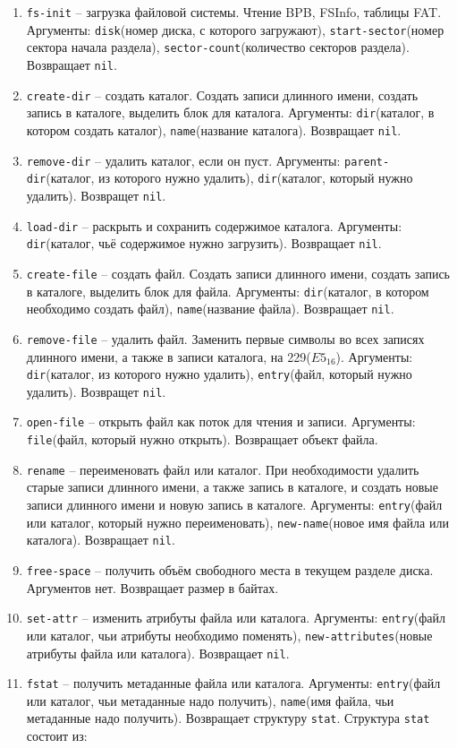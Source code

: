 \begin{enumerate}
	\begin{enumerate}
	\item \texttt{fs-init} -- загрузка файловой системы. Чтение BPB, FSInfo, таблицы FAT. Аргументы: \texttt{disk}(номер диска, с которого загружают), \texttt{start-sector}(номер сектора начала раздела), \texttt{sector-count}(количество секторов раздела). Возвращает \texttt{nil}.
	\item \texttt{create-dir} -- создать каталог. Создать записи длинного имени, создать запись в каталоге, выделить блок для каталога. Аргументы: \texttt{dir}(каталог, в котором создать каталог), \texttt{name}(название каталога). Возвращает \texttt{nil}.
	\item \texttt{remove-dir} -- удалить каталог, если он пуст. Аргументы: \texttt{parent-dir}(каталог, из которого нужно удалить), \texttt{dir}(каталог, который нужно удалить). Возвращет \texttt{nil}.
	\item \texttt{load-dir} -- раскрыть и сохранить содержимое каталога. Аргументы: \texttt{dir}(каталог, чьё содержимое нужно загрузить). Возвращает \texttt{nil}.
	\item \texttt{create-file} -- создать файл. Создать записи длинного имени, создать запись в каталоге, выделить блок для файла. Аргументы: \texttt{dir}(каталог, в котором необходимо создать файл), \texttt{name}(название файла). Возвращает \texttt{nil}.
	\item \texttt{remove-file} -- удалить файл. Заменить первые символы во всех записях длинного имени, а также в записи каталога, на 229($E5_{16}$). Аргументы: \texttt{dir}(каталог, из которого нужно удалить), \texttt{entry}(файл, который нужно удалить). Возвращет \texttt{nil}.
	\item \texttt{open-file} -- открыть файл как поток для чтения и записи. Аргументы: \texttt{file}(файл, который нужно открыть). Возвращает объект файла.
	\item \texttt{rename} -- переименовать файл или каталог. При необходимости удалить старые записи длинного имени, а также запись в каталоге, и создать новые записи длинного имени и новую запись в каталоге. Аргументы: \texttt{entry}(файл или каталог, который нужно переименовать), \texttt{new-name}(новое имя файла или каталога). Возвращает \texttt{nil}.
	\item \texttt{free-space} -- получить объём свободного места в текущем разделе диска. Аргументов нет. Возвращает размер в байтах.
	\item \texttt{set-attr} -- изменить атрибуты файла или каталога. Аргументы: \texttt{entry}(файл или каталог, чьи атрибуты необходимо поменять), \texttt{new-attributes}(новые атрибуты файла или каталога). Возвращает \texttt{nil}.
	\item \texttt{fstat} -- получить метаданные файла или каталога. Аргументы: \texttt{entry}(файл или каталог, чьи метаданные надо получить), \texttt{name}(имя файла, чьи метаданные надо получить). Возвращает структуру \texttt{stat}. Структура \texttt{stat} состоит из:
	

\end{enumerate}
\end{enumerate}
